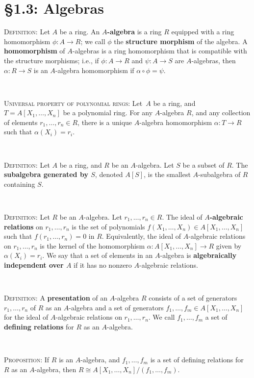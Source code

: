 \documentclass[12pt]{amsart}
\newcommand{\showsol}[1]{\def\displaysol{#1}}
\begin{document}
\showsol{1}
	
	\thispagestyle{empty}
	
	\section*{\S1.3: Algebras}	

\begin{framed}

\noindent \textsc{Definition:} Let $A$ be a ring. An \textbf{$A$-algebra} is a ring $R$ equipped with a ring homomorphism ${\phi:A\to R}$; we call $\phi$ the \textbf{structure morphism} of the algebra\footnotemark. A \textbf{homomorphism} of $A$-algebras is a ring homomorphism that is compatible with the structure morphisms; i.e., if $\phi:A\to R$ and $\psi:A\to S$ are $A$-algebras, then $\alpha:R\to S$ is an $A$-algebra homomorphism if $\alpha\circ \phi = \psi$.


\

\noindent \textsc{Universal property of polynomial rings:} Let\footnotemark \ $A$ be a ring, and $T=A[X_1,\dots,X_n]$ be a polynomial ring. For any $A$-algebra $R$, and any collection of elements $r_1,\dots,r_n\in R$, there is a unique $A$-algebra homomorphism $\alpha: T\to R$ such that $\alpha(X_i) = r_i$.


\


\noindent \textsc{Definition:} Let $A$ be a ring, and $R$ be an $A$-algebra. Let $S$ be a subset of $R$. The \textbf{subalgebra generated by $S$}, denoted $A[S]$, is the smallest $A$-subalgebra of $R$ containing $S$.

\


\noindent \textsc{Definition:} Let $R$ be an $A$-algebra. Let $r_1,\dots,r_n\in R$. The ideal of \textbf{$A$-algebraic relations} on $r_1,\dots,r_n$ is the set of polynomials $f(X_1,\dots,X_n)\in A[X_1,\dots,X_n]$ such that ${f(r_1,\dots,r_n)=0}$ in $R$. Equivalently, the ideal of $A$-algebraic relations on $r_1,\dots,r_n$ is the kernel of the homomorphism ${\alpha: A[X_1,\dots,X_n]\to R}$ given by $\alpha(X_i)=r_i$. We say that a set of elements in an $A$-algebra is \textbf{algebraically independent over $A$} if it has  no nonzero $A$-algebraic relations.

\

\noindent \textsc{Definition:} A \textbf{presentation} of an $A$-algebra $R$ consists of a set of generators $r_1,\dots,r_n$ of $R$ as an $A$-algebra and a set of generators $f_1,\dots,f_m\in A[X_1,\dots,X_n]$ for the ideal of $A$-algebraic relations on $r_1,\dots,r_n$. We call $f_1,\dots,f_m$ a set of \textbf{defining relations} for $R$ as an $A$-algebra.

\

\noindent \textsc{Proposition:} If $R$ is an $A$-algebra, and $f_1,\dots,f_m$ is a set of defining relations for $R$ as an $A$-algebra, then $R\cong A[X_1,\dots,X_n]/(f_1,\dots,f_m)$.

 
 \end{framed}
 
\end{document}
